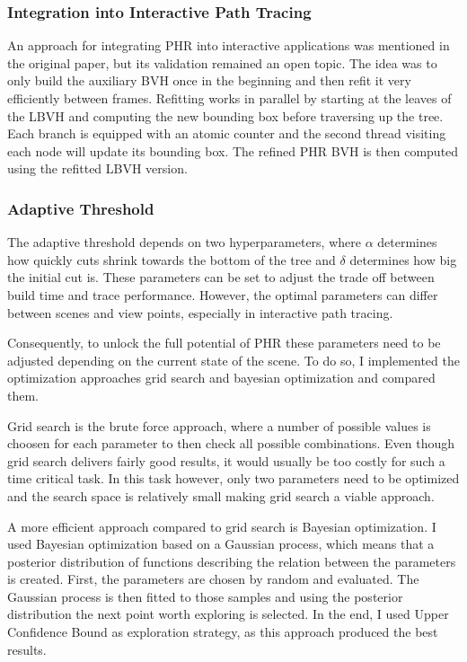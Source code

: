 \subsubsection{Integration into Interactive Path Tracing}
An approach for integrating PHR into interactive applications was mentioned in the original paper\cite{hendrich_parallel_2017}, but its validation remained an open topic. The idea was to only build the auxiliary BVH once in the beginning and then refit it very efficiently between frames. Refitting works in parallel by starting at the leaves of the LBVH and computing the new bounding box before traversing up the tree. Each branch is equipped with an atomic counter and the second thread visiting each node will update its bounding box. The refined PHR BVH is then computed using the refitted LBVH version. 

\subsubsection{Adaptive Threshold}
\label{adaptive threshold}
The adaptive threshold depends on two hyperparameters, where $\alpha$ determines how quickly cuts shrink towards the bottom of the tree and $\delta$ determines how big the initial cut is. These parameters can be set to adjust the trade off between build time and trace performance. However, the optimal parameters can differ between scenes and view points, especially in interactive path tracing. 



Consequently, to unlock the full potential of PHR these parameters need to be adjusted depending on the current state of the scene. To do so, I implemented the optimization approaches grid search and bayesian optimization and compared them.

Grid search is the brute force approach, where a number of possible values is choosen for each parameter to then check all possible combinations. Even though grid search delivers fairly good results, it would usually be too costly for such a time critical task. In this task however, only two parameters need to be optimized and the search space is relatively small making grid search a viable approach. 

A more efficient approach compared to grid search is Bayesian optimization. I used Bayesian optimization based on a Gaussian process, which means that a posterior distribution of functions describing the relation between the parameters is created. First, the parameters are chosen by random and evaluated. The Gaussian process is then fitted to those samples and using the posterior distribution the next point worth exploring is selected. In the end, I used Upper Confidence Bound as exploration strategy, as this approach produced the best results. 


